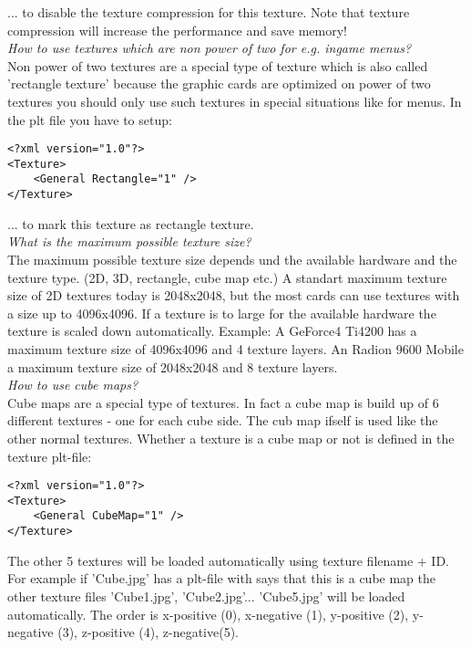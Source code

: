 ... to disable the texture compression for this texture. Note that texture compression will
increase the performance and save memory!\\


\emph{How to use textures which are non power of two for e.g. ingame menus?}\\
Non power of two textures are a special type of texture which is also called 'rectangle texture'
because the graphic cards are optimized on power of two textures you should only use such
textures in special situations like for menus. In the plt file you have to setup:\\

\begin{lstlisting}[caption=plt-file rectangle texture]
<?xml version="1.0"?>
<Texture>
    <General Rectangle="1" />
</Texture>
\end{lstlisting}

... to mark this texture as rectangle texture.\\


\emph{What is the maximum possible texture size?}\\
The maximum possible texture size depends und the available hardware and the texture type.
(2D, 3D, rectangle, cube map etc.)
A standart maximum texture size of 2D textures today is 2048x2048, but the most cards can use
textures with a size up to 4096x4096. If a texture is to large for the available hardware the
texture is scaled down automatically. Example: A GeForce4 Ti4200 has a maximum texture size of
4096x4096 and 4 texture layers. An Radion 9600 Mobile a maximum texture size of 2048x2048 and
8 texture layers.\\


\emph{How to use cube maps?}\\
Cube maps are a special type of textures. In fact a cube map is build up of 6 different textures -
one for each cube side. The cub map ifself is used like the other normal textures. Whether a
texture is a cube map or not is defined in the texture plt-file:\\

\begin{lstlisting}[caption=plt-file cube map]
<?xml version="1.0"?>
<Texture>
    <General CubeMap="1" />
</Texture>
\end{lstlisting}

The other 5 textures will be loaded automatically using texture filename + ID. For example if
'Cube.jpg' has a plt-file with says that this is a cube map the other texture files 'Cube1.jpg',
'Cube2.jpg'... 'Cube5.jpg' will be loaded automatically. The order is x-positive (0), x-negative (1),
y-positive (2), y-negative (3), z-positive (4), z-negative(5).\\


